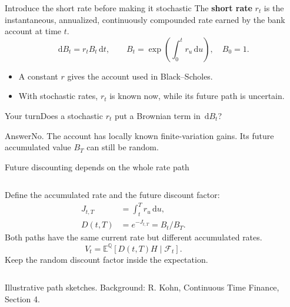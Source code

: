 \documentclass[handout,10pt,t,aspectratio=169]{beamer}
\newenvironment{pausebox}{\begin{block}{Your turn}}{\end{block}}
\newenvironment{answerbox}{\begin{exampleblock}{Answer}}{\end{exampleblock}}
\newcommand{\E}{\mathbb E}
\newcommand{\Q}{\mathbb Q}
\newcommand{\F}{\mathcal F}
\newcommand{\dd}{\,\mathrm d}
\newcommand{\source}[1]{\vfill{\scriptsize\color{gray}#1\par}}
\begin{document}
\begin{frame}{Introduce the short rate before making it stochastic}
The \textbf{short rate} \(r_t\) is the instantaneous, annualized,
continuously compounded rate earned by the bank account at time \(t\).
\[
 \dd B_t=r_tB_t\dd t,\qquad
 B_t=\exp\!\left(\int_0^t r_u\dd u\right),\quad B_0=1.
\]
\begin{itemize}
\item A constant \(r\) gives the account used in Black--Scholes.
\item With stochastic rates, \(r_t\) is known now, while its future path is uncertain.
\end{itemize}
\begin{pausebox}Does a stochastic \(r_t\) put a Brownian term in \(\dd B_t\)?\end{pausebox}
\begin{answerbox}No. The account has locally known finite-variation gains.
Its future accumulated value \(B_T\) can still be random.\end{answerbox}
\end{frame}

\begin{frame}{Future discounting depends on the whole rate path}
\begin{columns}[T,onlytextwidth]
Define the accumulated rate and the future discount factor:
\[
 \begin{aligned}
 J_{t,T}&=\int_t^T r_u\dd u,\\
 D(t,T)&=e^{-J_{t,T}}=B_t/B_T.
 \end{aligned}
\]
Both paths have the same current rate but different accumulated rates.
\[
 \boxed{V_t=\E^\Q[D(t,T)H\mid\F_t].}
\]
Keep the random discount factor inside the expectation.
\end{columns}
\source{Illustrative path sketches. Background: R. Kohn, Continuous Time Finance, Section 4.}
\end{frame}
\end{document}
